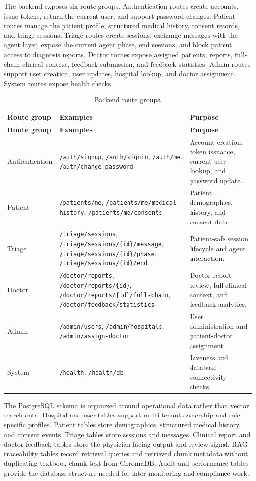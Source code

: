 The backend exposes six route groups. Authentication routes create accounts, issue tokens, return the current user, and support password changes. Patient routes manage the patient profile, structured medical history, consent records, and triage sessions. Triage routes create sessions, exchange messages with the agent layer, expose the current agent phase, end sessions, and block patient access to diagnosis reports. Doctor routes expose assigned patients, reports, full-chain clinical context, feedback submission, and feedback statistics. Admin routes support user creation, user updates, hospital lookup, and doctor assignment. System routes expose health checks.

\begin{longtable}{p{} p{} p{}}
\caption{Backend route groups.}
\label{tab:backend_route_groups}\\
\toprule
\textbf{Route group} & \textbf{Examples} & \textbf{Purpose}\\
\midrule
\endfirsthead
\toprule
\textbf{Route group} & \textbf{Examples} & \textbf{Purpose}\\
\midrule
\endhead
Authentication & \texttt{/auth/signup}, \texttt{/auth/signin}, \texttt{/auth/me}, \texttt{/auth/change-password} & Account creation, token issuance, current-user lookup, and password update.\\
Patient & \texttt{/patients/me}, \texttt{/patients/me/medical-history}, \texttt{/patients/me/consents} & Patient demographics, history, and consent data.\\
Triage & \texttt{/triage/sessions}, \texttt{/triage/sessions/\{id\}/message}, \texttt{/triage/sessions/\{id\}/phase}, \texttt{/triage/sessions/\{id\}/end} & Patient-safe session lifecycle and agent interaction.\\
Doctor & \texttt{/doctor/reports}, \texttt{/doctor/reports/\{id\}}, \texttt{/doctor/reports/\{id\}/full-chain}, \texttt{/doctor/feedback/statistics} & Doctor report review, full clinical context, and feedback analytics.\\
Admin & \texttt{/admin/users}, \texttt{/admin/hospitals}, \texttt{/admin/assign-doctor} & User administration and patient-doctor assignment.\\
System & \texttt{/health}, \texttt{/health/db} & Liveness and database connectivity checks.\\
\bottomrule
\end{longtable}

The PostgreSQL schema is organized around operational data rather than vector search data. Hospital and user tables support multi-tenant ownership and role-specific profiles. Patient tables store demographics, structured medical history, and consent events. Triage tables store sessions and messages. Clinical report and doctor feedback tables store the physician-facing output and review signal. RAG traceability tables record retrieval queries and retrieved chunk metadata without duplicating textbook chunk text from ChromaDB. Audit and performance tables provide the database structure needed for later monitoring and compliance work.


